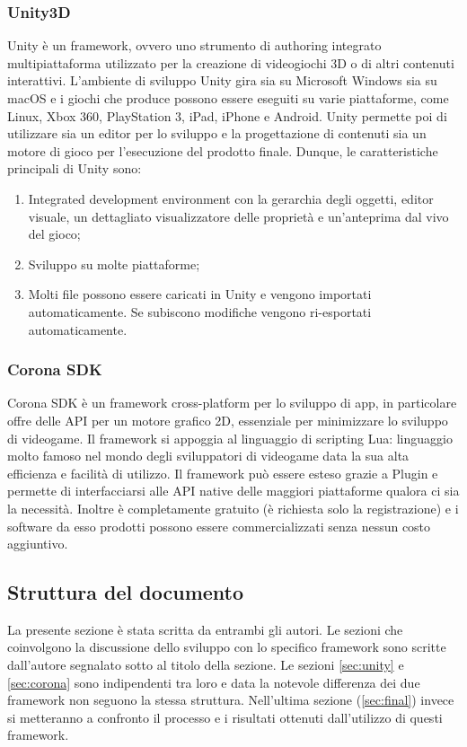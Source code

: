 		\subsubsection{Unity3D}
			Unity è un framework, ovvero uno strumento di authoring integrato multipiattaforma utilizzato per la creazione di videogiochi 3D o di altri contenuti interattivi. 
			L'ambiente di sviluppo Unity gira sia su Microsoft Windows sia su macOS e i giochi che produce possono essere eseguiti su varie piattaforme, come Linux, Xbox 360, PlayStation 3, iPad, iPhone e Android. 
			Unity permette poi di utilizzare sia un editor per lo sviluppo e la progettazione di contenuti sia un motore di gioco per l'esecuzione del prodotto finale. 
			Dunque, le caratteristiche principali di Unity sono:
			\begin{enumerate}
				\item Integrated development environment con la gerarchia degli oggetti, editor visuale, un dettagliato visualizzatore delle proprietà e un'anteprima dal vivo del gioco;
				\item Sviluppo su molte piattaforme;
				\item Molti file possono essere caricati in Unity e vengono importati automaticamente. Se subiscono modifiche vengono ri-esportati automaticamente.
			\end{enumerate}
		
		\subsubsection{Corona SDK}
			Corona SDK è un framework cross-platform per lo sviluppo di app, in particolare offre delle API per un motore grafico 2D, essenziale per minimizzare lo sviluppo di videogame. Il framework si appoggia al linguaggio di scripting Lua: linguaggio molto famoso nel mondo degli sviluppatori di videogame data la sua alta efficienza e facilità di utilizzo. Il framework può essere esteso grazie a Plugin e permette di interfacciarsi alle API native delle maggiori piattaforme qualora ci sia la necessità. Inoltre è completamente gratuito (è richiesta solo la registrazione) e i software da esso prodotti possono essere commercializzati senza nessun costo aggiuntivo.
		
		
	\subsection{Struttura del documento}
		La presente sezione è stata scritta da entrambi gli autori. Le sezioni che coinvolgono la discussione dello sviluppo con lo specifico framework sono scritte dall'autore segnalato sotto al titolo della sezione. Le sezioni \ref{sec:unity} e \ref{sec:corona} sono indipendenti tra loro e data la notevole differenza dei due framework non seguono la stessa struttura. Nell'ultima sezione (\ref{sec:final}) invece si metteranno a confronto il processo e i risultati ottenuti dall'utilizzo di questi framework.
		
